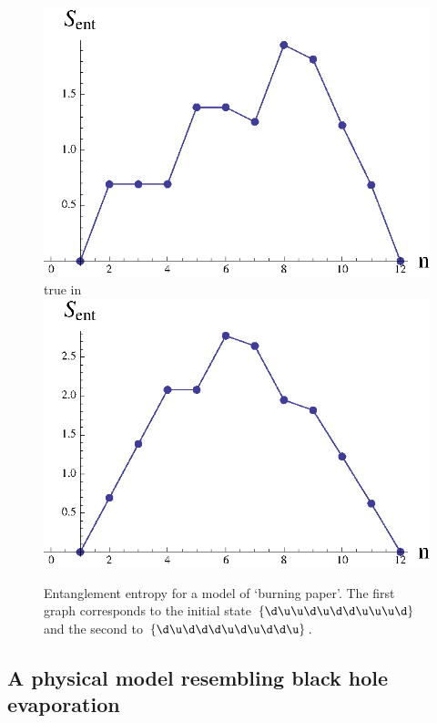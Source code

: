 \documentclass[11pt]{article}
\begin{document}
\begin{figure}[htbp]
\begin{center}
\includegraphics[scale=.58]{burning1p.eps} true in
\includegraphics[scale=.58]{burning2p.eps}
\caption{{Entanglement entropy for a model of `burning paper'. The first graph corresponds to the initial state $\{\d\u\u\d\u\d\d\u\u\u\d\}$ and the second to $\{\d\u\d\d\d\u\d\u\d\d\u \} $.}}
\label{fn7m}
\end{center}
\end{figure}


\subsection{A physical model resembling black hole evaporation}
\end{document}
